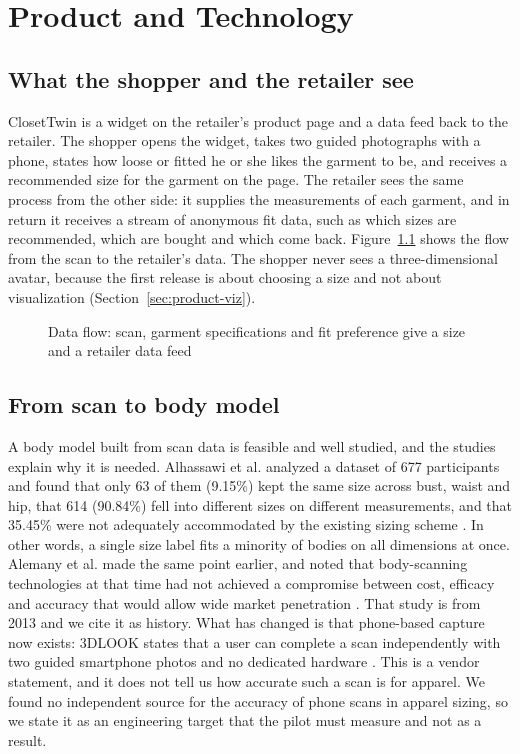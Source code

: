 \chapter{Product and Technology}\label{ch:product}

\section{What the shopper and the retailer see}\label{sec:product-see}

ClosetTwin is a widget on the retailer's product page and a data feed back to the retailer. The shopper opens the widget, takes two guided photographs with a phone, states how loose or fitted he or she likes the garment to be, and receives a recommended size for the garment on the page. The retailer sees the same process from the other side: it supplies the measurements of each garment, and in return it receives a stream of anonymous fit data, such as which sizes are recommended, which are bought and which come back. Figure~\ref{fig:f3} shows the flow from the scan to the retailer's data. The shopper never sees a three-dimensional avatar, because the first release is about choosing a size and not about visualization (Section~\ref{sec:product-viz}).

\begin{figure}

\caption{Data flow: scan, garment specifications and fit preference give a size and a retailer data feed}\label{fig:f3}
\end{figure}

\section{From scan to body model}\label{sec:product-scan}

A body model built from scan data is feasible and well studied, and the studies explain why it is needed. Alhassawi et al. analyzed a dataset of 677 participants and found that only 63 of them (9.15\%) kept the same size across bust, waist and hip, that 614 (90.84\%) fell into different sizes on different measurements, and that 35.45\% were not adequately accommodated by the existing sizing scheme \cite{alhassawi2025}. In other words, a single size label fits a minority of bodies on all dimensions at once. Alemany et al. made the same point earlier, and noted that body-scanning technologies at that time had not achieved a compromise between cost, efficacy and accuracy that would allow wide market penetration \cite{alemany2013}. That study is from 2013 and we cite it as history. What has changed is that phone-based capture now exists: 3DLOOK states that a user can complete a scan independently with two guided smartphone photos and no dedicated hardware \cite{threedlook_pricing}. This is a vendor statement, and it does not tell us how accurate such a scan is for apparel. We found no independent source for the accuracy of phone scans in apparel sizing, so we state it as an engineering target that the pilot must measure and not as a result.

